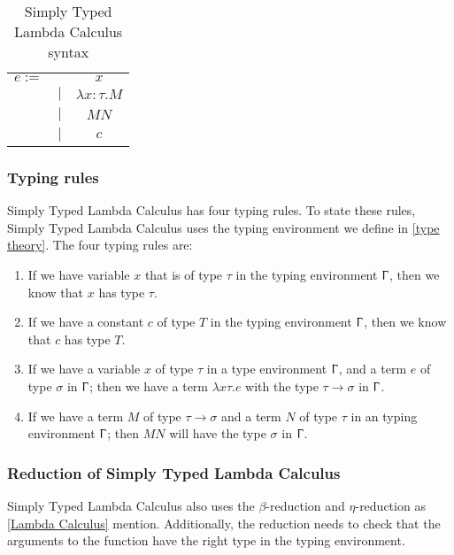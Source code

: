 \begin{table}[]
    \centering
    \begin{tabular}{c c c}
         $e :=$&  & $x$\\
         & $|$ & $\lambda x:\tau.M$ \\
         & $|$ &  $M N$ \\
         & $|$ &  $c$ \\
    \end{tabular}
    \caption{Simply Typed Lambda Calculus syntax}
    \label{tab:STLC syntax}
\end{table}

\subsubsection{Typing rules}
Simply Typed Lambda Calculus has four typing rules. To state these rules, Simply Typed Lambda Calculus uses the typing environment we define in \autoref{type theory}. The four typing rules are:

\begin{enumerate}
    \item If we have variable $x$ that is of type $\tau$ in the typing environment $\Upgamma$, then we know that $x$ has type $\tau$.
    \item If we have a constant $c$ of type $T$ in the typing environment $\Upgamma$, then we know that $c$ has type $T$.
    \item If we have a variable $x$ of type $\tau$ in a type environment $\Upgamma$, and a term $e$ of type $\sigma$ in $\Upgamma$; then we have a term $\lambda x\tau .e$ with the type $\tau \rightarrow \sigma$ in $\Upgamma$.
    \item If we have a term $M$ of type $\tau \rightarrow \sigma$ and a term $N$ of type $\tau$ in an typing environment $\Upgamma$; then $M N$ will have the type $\sigma$ in $\Upgamma$.
\end{enumerate}

\subsubsection{Reduction of Simply Typed Lambda Calculus}
Simply Typed Lambda Calculus also uses the $\beta$-reduction and $\eta$-reduction as \autoref{Lambda Calculus} mention. Additionally, the reduction needs to check that the arguments to the function have the right type in the typing environment. 

